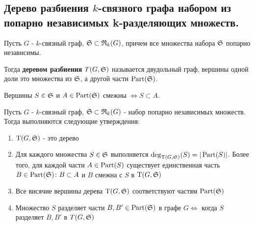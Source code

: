 \subsection{Дерево разбиения $k$-связного графа набором из попарно независимых k-разделяющих множеств.}

\begin{df*} \label{definition:tree_of_partition}
	Пусть $G$ - $k$-связный граф, $\S \subset \R_k(G)$, причем все множества набора $\S$ попарно независимы.

	Тогда \textbf{деревом разбиения} $T(G, \S)$ называется двудольный граф, вершины одной доли это множества из $\S$, а другой части $\Part(\S)$.

	Вершины $S \in \S$ и $A \in \Part(\S)$ смежны $\iff S \subset A$.
\end{df*}

\begin{customthm}{1.1} \label{theorem:1_1}
	Пусть $G$ -  $k$-связный граф, $\S \subset \R_k(G)$ - набор попарно независимых множеств.
	Тогда выполняются следующие утверждения:

	 \begin{enumerate}
		 \item $\wT(G, \S)$ - это дерево \label{stmt:theorem_1_1_1}
		 \item Для каждого множества $S \in \S$ выполняется  $\deg_{\wT(G, \S)}(S) = |\Part(S)|$.
			 Более того, для каждой части  $A \in \Part(S)$ существует единственная часть  $B \in \Part(\S) \colon B \subset A$ и  $B$ смежна с  $S$ в  $\wT(G, \S)$ \label{stmt:theorem_1_1_2}
		 \item Все висячие вершины дерева  $\wT(G, \S)$ соответствуют частям  $\Part(\S)$ \label{stmt:theorem_1_1_3}
		 \item Множество  $S$ разделяет части  $B, B' \in \Part(\S)$ в графе  $G \iff$ когда  $S$ разделяет  $B, B'$ в  $T(G, \S)$ \label{stmt:theorem_1_1_4}
	\end{enumerate}
	
\end{customthm}

